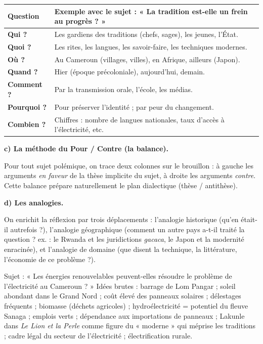 \documentclass[11pt]{article}
\newcommand{\cle}[1]{{\popxbold\color{popdark}#1}}
\begin{document}
\begin{center}
\begin{tabularx}{\linewidth}{|l|X|}\hline
\rowcolor{popblueL} \textbf{Question} & \textbf{Exemple avec le sujet : « La tradition est-elle un frein au progrès ? »} \\ \hline
\textbf{Qui ?} & Les gardiens des traditions (chefs, sages), les jeunes, l'État. \\ \hline
\textbf{Quoi ?} & Les rites, les langues, les savoir-faire, les techniques modernes. \\ \hline
\textbf{Où ?} & Au Cameroun (villages, villes), en Afrique, ailleurs (Japon). \\ \hline
\textbf{Quand ?} & Hier (époque précoloniale), aujourd'hui, demain. \\ \hline
\textbf{Comment ?} & Par la transmission orale, l'école, les médias. \\ \hline
\textbf{Pourquoi ?} & Pour préserver l'identité ; par peur du changement. \\ \hline
\textbf{Combien ?} & Chiffres : nombre de langues nationales, taux d'accès à l'électricité, etc. \\ \hline
\end{tabularx}
\end{center}

\textbf{c) La méthode du Pour / Contre (la balance).}

Pour tout sujet polémique, on trace deux colonnes sur le brouillon : à gauche les arguments \emph{en faveur} de la thèse implicite du sujet, à droite les arguments \emph{contre}. Cette balance prépare naturellement le plan dialectique (thèse / antithèse).

\textbf{d) Les analogies.}

On enrichit la réflexion par trois déplacements : l'\cle{analogie historique} (qu'en était-il autrefois ?), l'\cle{analogie géographique} (comment un autre pays a-t-il traité la question ? ex. : le Rwanda et les juridictions \emph{gacaca}, le Japon et la modernité enracinée), et l'\cle{analogie de domaine} (que disent la technique, la littérature, l'économie de ce problème ?).

\begin{exemplebox}
Sujet : « Les énergies renouvelables peuvent-elles résoudre le problème de l'électricité au Cameroun ? » Idées brutes : barrage de Lom Pangar ; soleil abondant dans le Grand Nord ; coût élevé des panneaux solaires ; délestages fréquents ; biomasse (déchets agricoles) ; hydroélectricité = potentiel du fleuve Sanaga ; emplois verts ; dépendance aux importations de panneaux ; Lakunle dans \emph{Le Lion et la Perle} comme figure du « moderne » qui méprise les traditions ; cadre légal du secteur de l'électricité ; électrification rurale.
\end{exemplebox}
\end{document}
